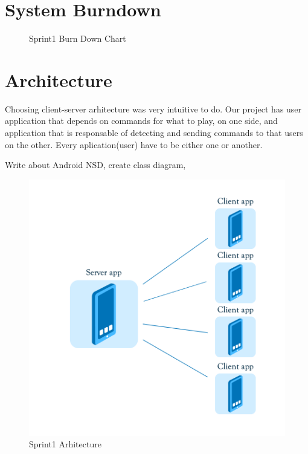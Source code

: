 \section{System Burndown}

\begin{figure}[H]
	\centering
	\caption{Sprint1 Burn Down Chart}
	\label{fig:sprint1_burn_down_chart}
\end{figure}

\section{Architecture}

Choosing client-server arhitecture was very intuitive to do.
Our project has user application that depends on commands for what to play, on one side, and application that is responsable of detecting and sending commands to that users on the other.
Every aplication(user) have to be either one or another. 

Write about Android NSD, create class diagram, 


\begin{figure}[!t]
	\centering
		\includegraphics[width=16cm]{sprint1/arhitecture.png}
	\caption{Sprint1 Arhitecture}
	\label{fig:sprint1_arhitecture}
\end{figure}


